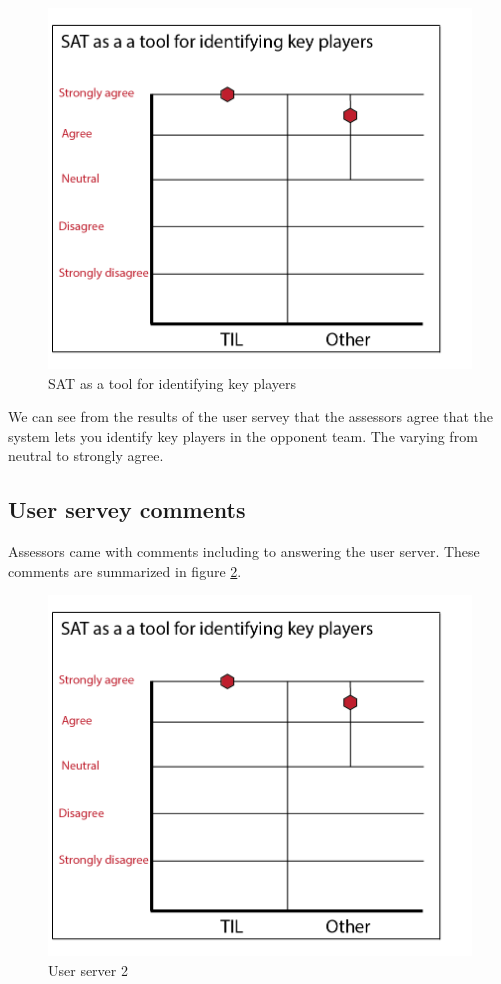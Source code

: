 \begin{figure}[ht!]
\centering
\includegraphics[width=1\textwidth]{images/evaluation/user_servery2}
\caption{SAT as a tool for identifying key players}
\label{fig:user_servery2}
\end{figure}

We can see from the results of the user servey that the assessors agree that the system lets you identify key players in the opponent team. The varying from neutral to strongly agree.

\subsection{User servey comments}
Assessors came with comments including to answering the user server. These comments are summarized in figure \ref{fig:comments}.

\begin{figure}[ht!]
\centering
\includegraphics[width=1\textwidth]{images/evaluation/user_servery2}
\caption{User server 2}
\label{fig:comments}
\end{figure}


